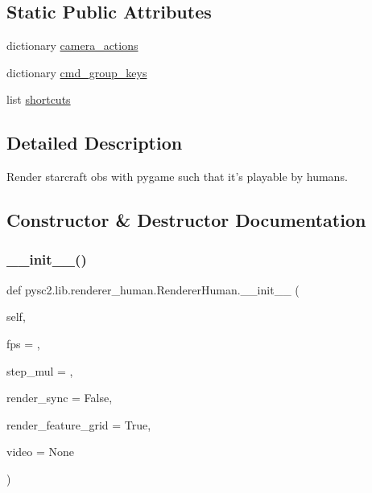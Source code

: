 \subsection*{Static Public Attributes}
\begin{DoxyCompactItemize}
\item 
dictionary \mbox{\hyperlink{classpysc2_1_1lib_1_1renderer__human_1_1_renderer_human_a7e2eeb0419488ec01dd3d8254a66f86a}{camera\+\_\+actions}}
\item 
dictionary \mbox{\hyperlink{classpysc2_1_1lib_1_1renderer__human_1_1_renderer_human_a144bae56c82766dfef0086979c5564e5}{cmd\+\_\+group\+\_\+keys}}
\item 
list \mbox{\hyperlink{classpysc2_1_1lib_1_1renderer__human_1_1_renderer_human_a333c02966efae679e670e9de19640957}{shortcuts}}
\end{DoxyCompactItemize}


\subsection{Detailed Description}
\begin{DoxyVerb}Render starcraft obs with pygame such that it's playable by humans.\end{DoxyVerb}
 

\subsection{Constructor \& Destructor Documentation}
\mbox{\label{classpysc2_1_1lib_1_1renderer__human_1_1_renderer_human_a26faecf964f718dda37529ab44187500}} 
\subsubsection{\texorpdfstring{\+\_\+\+\_\+init\+\_\+\+\_\+()}{\_\_init\_\_()}}
{\footnotesize\ttfamily def pysc2.\+lib.\+renderer\+\_\+human.\+Renderer\+Human.\+\_\+\+\_\+init\+\_\+\+\_\+ (\begin{DoxyParamCaption}\item[{}]{self,  }\item[{}]{fps = {},  }\item[{}]{step\+\_\+mul = {},  }\item[{}]{render\+\_\+sync = {\ttfamily False},  }\item[{}]{render\+\_\+feature\+\_\+grid = {\ttfamily True},  }\item[{}]{video = {\ttfamily None} }\end{DoxyParamCaption})}

